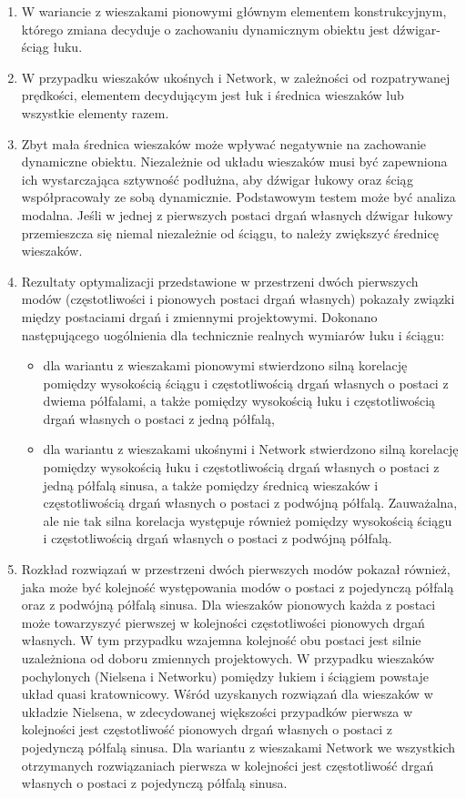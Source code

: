 \begin{enumerate}
\item W wariancie z wieszakami pionowymi głównym elementem konstrukcyjnym, którego zmiana decyduje o zachowaniu dynamicznym obiektu jest dźwigar-ściąg łuku. 

\item W przypadku wieszaków ukośnych i Network, w zależności od rozpatrywanej prędkości, elementem decydującym jest łuk i średnica wieszaków lub wszystkie elementy razem. 

\item Zbyt mała średnica wieszaków może wpływać negatywnie na zachowanie dynamiczne obiektu. Niezależnie od układu wieszaków musi być zapewniona ich wystarczająca sztywność podłużna, aby dźwigar łukowy oraz ściąg współpracowały ze sobą dynamicznie. Podstawowym testem może być analiza modalna. Jeśli w jednej z pierwszych postaci drgań własnych dźwigar łukowy przemieszcza się niemal niezależnie od ściągu, to należy zwiększyć średnicę wieszaków. 

\item Rezultaty optymalizacji przedstawione w przestrzeni dwóch pierwszych modów (częstotliwości i pionowych postaci drgań własnych) pokazały związki między postaciami drgań i zmiennymi projektowymi. Dokonano następującego uogólnienia dla technicznie realnych wymiarów łuku i ściągu:
\begin{itemize} 
	\item dla wariantu z wieszakami pionowymi stwierdzono silną korelację pomiędzy wysokością ściągu i częstotliwością drgań własnych o postaci z dwiema półfalami, a także pomiędzy wysokością łuku i częstotliwością drgań własnych o postaci z jedną półfalą,
	\item dla wariantu z wieszakami ukośnymi i Network stwierdzono silną korelację pomiędzy wysokością łuku i częstotliwością drgań własnych o postaci z jedną półfalą sinusa, a także pomiędzy średnicą wieszaków i częstotliwością drgań własnych o postaci z podwójną półfalą. Zauważalna, ale nie tak silna korelacja występuje również pomiędzy wysokością ściągu i częstotliwością drgań własnych o postaci z podwójną półfalą. 
\end{itemize}

\item Rozkład rozwiązań w przestrzeni dwóch pierwszych modów pokazał również, jaka może być kolejność występowania modów o postaci z pojedynczą półfalą oraz z podwójną półfalą sinusa. Dla wieszaków pionowych każda z postaci może towarzyszyć pierwszej w kolejności częstotliwości pionowych drgań własnych. W tym przypadku wzajemna kolejność obu postaci jest silnie uzależniona od doboru zmiennych projektowych. W przypadku wieszaków pochylonych (Nielsena i Networku) pomiędzy łukiem i ściągiem powstaje układ quasi kratownicowy. Wśród uzyskanych rozwiązań dla wieszaków w układzie Nielsena, w zdecydowanej większości przypadków pierwsza w kolejności jest częstotliwość pionowych drgań własnych o postaci z pojedynczą półfalą sinusa. Dla wariantu z wieszakami Network we wszystkich otrzymanych rozwiązaniach pierwsza w kolejności jest częstotliwość drgań własnych o postaci z pojedynczą półfalą sinusa.


\end{enumerate}
